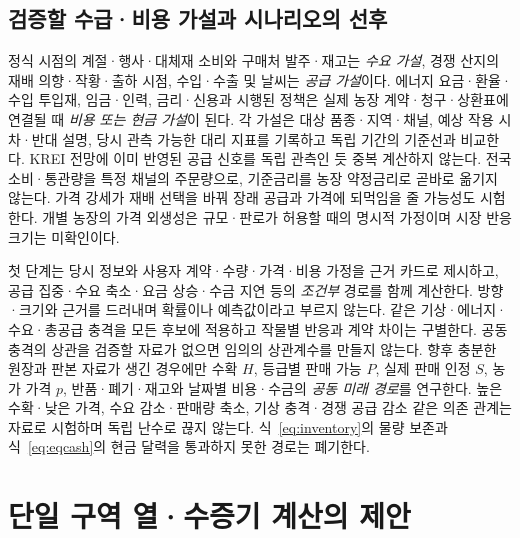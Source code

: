 \documentclass[11pt,a4paper]{article}
\begin{document}
\subsection{검증할 수급·비용 가설과 시나리오의 선후}
정식 시점의 계절·행사·대체재 소비와 구매처 발주·재고는 \emph{수요 가설}, 경쟁 산지의 재배 의향·작황·출하 시점, 수입·수출 및 날씨는 \emph{공급 가설}이다. 에너지 요금·환율·수입 투입재, 임금·인력, 금리·신용과 시행된 정책은 실제 농장 계약·청구·상환표에 연결될 때 \emph{비용 또는 현금 가설}이 된다. 각 가설은 대상 품종·지역·채널, 예상 작용 시차·반대 설명, 당시 관측 가능한 대리 지표를 기록하고 독립 기간의 기준선과 비교한다. KREI 전망에 이미 반영된 공급 신호를 독립 관측인 듯 중복 계산하지 않는다. 전국 소비·통관량을 특정 채널의 주문량으로, 기준금리를 농장 약정금리로 곧바로 옮기지 않는다. 가격 강세가 재배 선택을 바꿔 장래 공급과 가격에 되먹임을 줄 가능성도 시험한다. 개별 농장의 가격 외생성은 규모·판로가 허용할 때의 명시적 가정이며 시장 반응 크기는 미확인이다.

첫 단계는 당시 정보와 사용자 계약·수량·가격·비용 가정을 근거 카드로 제시하고, 공급 집중·수요 축소·요금 상승·수금 지연 등의 \emph{조건부} 경로를 함께 계산한다. 방향·크기와 근거를 드러내며 확률이나 예측값이라고 부르지 않는다. 같은 기상·에너지·수요·총공급 충격을 모든 후보에 적용하고 작물별 반응과 계약 차이는 구별한다. 공동 충격의 상관을 검증할 자료가 없으면 임의의 상관계수를 만들지 않는다. 향후 충분한 원장과 판본 자료가 생긴 경우에만 수확 $H$, 등급별 판매 가능 $P$, 실제 판매 인정 $S$, 농가 가격 $p$, 반품·폐기·재고와 날짜별 비용·수금의 \emph{공동 미래 경로}를 연구한다. 높은 수확·낮은 가격, 수요 감소·판매량 축소, 기상 충격·경쟁 공급 감소 같은 의존 관계는 자료로 시험하며 독립 난수로 끊지 않는다. 식~\eqref{eq:inventory}의 물량 보존과 식~\eqref{eq:eqcash}의 현금 달력을 통과하지 못한 경로는 폐기한다.

\section{단일 구역 열·수증기 계산의 제안}
\end{document}
